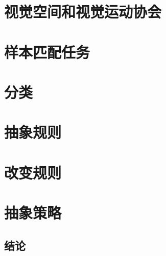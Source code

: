 \section{视觉空间和视觉运动协会}

\section{样本匹配任务}

\section{分类}

\section{抽象规则}

\section{改变规则}

\section{抽象策略}

\subsection{结论}


